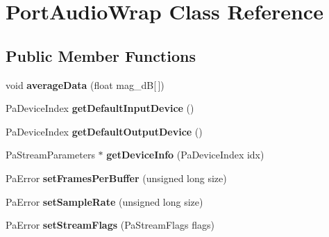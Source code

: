 \hypertarget{class_port_audio_wrap}{\section{Port\-Audio\-Wrap Class Reference}
\label{class_port_audio_wrap}
}
\subsection*{Public Member Functions}
\begin{DoxyCompactItemize}
\item 
\hypertarget{class_port_audio_wrap_a987405b6ca5fbecb33ac69ddfe843659}{void {\bfseries average\-Data} (float mag\-\_\-d\-B\mbox{[}$\,$\mbox{]})}\label{class_port_audio_wrap_a987405b6ca5fbecb33ac69ddfe843659}

\item 
\hypertarget{class_port_audio_wrap_a2a122bf5de62e7f1fb1bfed6801e063c}{Pa\-Device\-Index {\bfseries get\-Default\-Input\-Device} ()}\label{class_port_audio_wrap_a2a122bf5de62e7f1fb1bfed6801e063c}

\item 
\hypertarget{class_port_audio_wrap_a8cde3f5f6f312fbd8c0ad60619d617ad}{Pa\-Device\-Index {\bfseries get\-Default\-Output\-Device} ()}\label{class_port_audio_wrap_a8cde3f5f6f312fbd8c0ad60619d617ad}

\item 
\hypertarget{class_port_audio_wrap_a246ec79a44d879a74d6afe3e1005bc00}{Pa\-Stream\-Parameters $\ast$ {\bfseries get\-Device\-Info} (Pa\-Device\-Index idx)}\label{class_port_audio_wrap_a246ec79a44d879a74d6afe3e1005bc00}

\item 
\hypertarget{class_port_audio_wrap_a34ec7a96cbe5859f4a6aba6cb4b508cf}{Pa\-Error {\bfseries set\-Frames\-Per\-Buffer} (unsigned long size)}\label{class_port_audio_wrap_a34ec7a96cbe5859f4a6aba6cb4b508cf}

\item 
\hypertarget{class_port_audio_wrap_a7245832a8cafbc8d140a51e106838fbb}{Pa\-Error {\bfseries set\-Sample\-Rate} (unsigned long size)}\label{class_port_audio_wrap_a7245832a8cafbc8d140a51e106838fbb}

\item 
\hypertarget{class_port_audio_wrap_a47fe0dd437c0a4693824966e7100255a}{Pa\-Error {\bfseries set\-Stream\-Flags} (Pa\-Stream\-Flags flags)}\label{class_port_audio_wrap_a47fe0dd437c0a4693824966e7100255a}


\end{DoxyCompactItemize}
